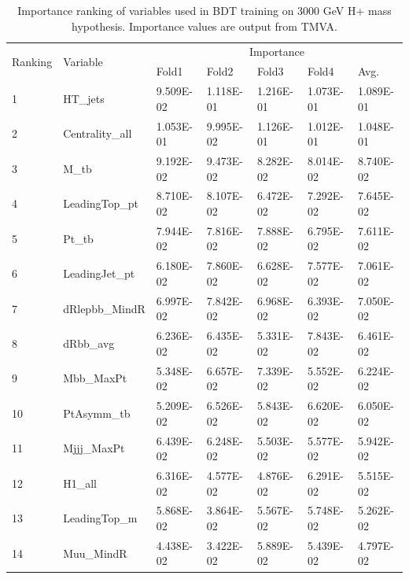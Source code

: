 \begin{description}
    \begin{table}[H]
      \centering
      \begin{tabular*}{160mm}{@{\extracolsep{\fill}}lllllll}
        \hline\hline
        \multirow{2}{*}{Ranking} & \multirow{2}{*}{Variable} & \multicolumn{5}{c}{Importance}\\
                                 &                           & Fold1 & Fold2 & Fold3 & Fold4 & Avg.\\
        \hline
        1  & HT\_jets        & 9.509E-02 & 1.118E-01 & 1.216E-01 & 1.073E-01 & 1.089E-01\\
        2  & Centrality\_all & 1.053E-01 & 9.995E-02 & 1.126E-01 & 1.012E-01 & 1.048E-01\\
        3  & M\_tb           & 9.192E-02 & 9.473E-02 & 8.282E-02 & 8.014E-02 & 8.740E-02\\
        4  & LeadingTop\_pt  & 8.710E-02 & 8.107E-02 & 6.472E-02 & 7.292E-02 & 7.645E-02\\
        5  & Pt\_tb          & 7.944E-02 & 7.816E-02 & 7.888E-02 & 6.795E-02 & 7.611E-02\\
        6  & LeadingJet\_pt  & 6.180E-02 & 7.860E-02 & 6.628E-02 & 7.577E-02 & 7.061E-02\\
        7  & dRlepbb\_MindR  & 6.997E-02 & 7.842E-02 & 6.968E-02 & 6.393E-02 & 7.050E-02\\
        8  & dRbb\_avg       & 6.236E-02 & 6.435E-02 & 5.331E-02 & 7.843E-02 & 6.461E-02\\
        9  & Mbb\_MaxPt      & 5.348E-02 & 6.657E-02 & 7.339E-02 & 5.552E-02 & 6.224E-02\\
        10 & PtAsymm\_tb     & 5.209E-02 & 6.526E-02 & 5.843E-02 & 6.620E-02 & 6.050E-02\\
        11 & Mjjj\_MaxPt     & 6.439E-02 & 6.248E-02 & 5.503E-02 & 5.577E-02 & 5.942E-02\\
        12 & H1\_all         & 6.316E-02 & 4.577E-02 & 4.876E-02 & 6.291E-02 & 5.515E-02\\
        13 & LeadingTop\_m   & 5.868E-02 & 3.864E-02 & 5.567E-02 & 5.748E-02 & 5.262E-02\\
        14 & Muu\_MindR      & 4.438E-02 & 3.422E-02 & 5.889E-02 & 5.439E-02 & 4.797E-02\\
        \hline\hline
      \end{tabular*}
      \caption{Importance ranking of variables used in BDT training on 3000 GeV H+ mass hypothesis. Importance values are output from TMVA.}
      \label{tab:RankingOfBDTInputVariables_Hp3000}
    \end{table}


\end{description}
